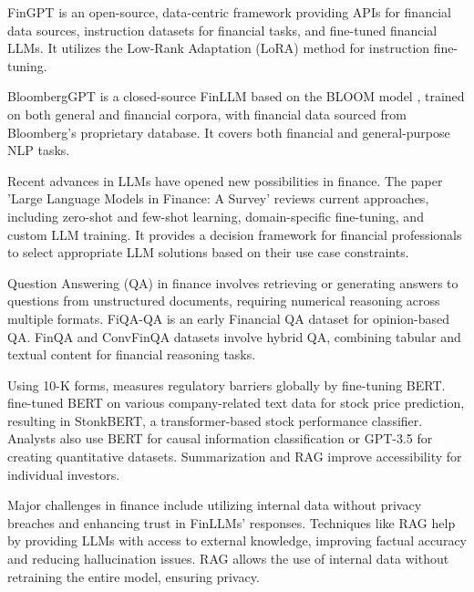 FinGPT \cite{Yang.9Jun2023} is an open-source, data-centric framework providing APIs for financial data sources, instruction datasets for financial tasks, and fine-tuned financial LLMs. It utilizes the Low-Rank Adaptation (LoRA) method for instruction fine-tuning.

BloombergGPT \cite{Wu.30Mar2023} is a closed-source FinLLM based on the BLOOM model \cite{Workshop.9Nov2022}, trained on both general and financial corpora, with financial data sourced from Bloomberg’s proprietary database. It covers both financial and general-purpose NLP tasks.

Recent advances in LLMs have opened new possibilities in finance. The paper 'Large Language Models in Finance: A Survey' \cite{Li.28Sep2023} reviews current approaches, including zero-shot and few-shot learning, domain-specific fine-tuning, and custom LLM training. It provides a decision framework for financial professionals to select appropriate LLM solutions based on their use case constraints.

Question Answering (QA) in finance involves retrieving or generating answers to questions from unstructured documents, requiring numerical reasoning across multiple formats. FiQA-QA \cite{Yang.23Aug2018} is an early Financial QA dataset for opinion-based QA. FinQA \cite{Chen.1Sep2021} and ConvFinQA \cite{Chen.8Oct2022} datasets involve hybrid QA, combining tabular and textual content for financial reasoning tasks.

Using 10-K forms, \cite{Ge.26Jan2023} measures regulatory barriers globally by fine-tuning BERT. \cite{Pasch.4Feb2022} fine-tuned BERT on various company-related text data for stock price prediction, resulting in StonkBERT, a transformer-based stock performance classifier. Analysts also use BERT for causal information classification or GPT-3.5 for creating quantitative datasets. Summarization and RAG improve accessibility for individual investors.

Major challenges in finance include utilizing internal data without privacy breaches and enhancing trust in FinLLMs' responses. Techniques like RAG \cite{Lewis.22May2020} help by providing LLMs with access to external knowledge, improving factual accuracy and reducing hallucination issues. RAG allows the use of internal data without retraining the entire model, ensuring privacy.